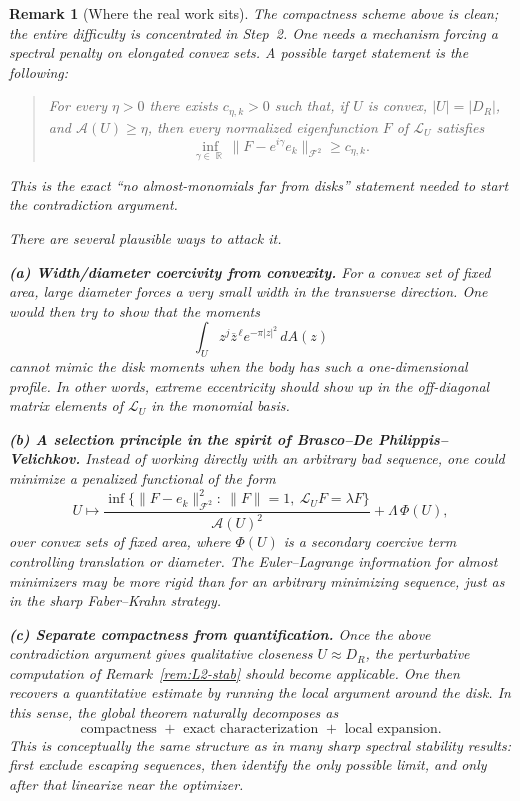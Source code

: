 \documentclass[a4paper,11pt,reqno]{amsart}
\newtheorem{remark}{Remark}[section]
\DeclareMathOperator{\R}{\mathbb{R}}
\begin{document}
\begin{remark}[Where the real work sits]
The compactness scheme above is clean; the entire difficulty is concentrated in
Step~2. One needs a mechanism forcing a spectral penalty on elongated convex sets.
A possible target statement is the following:
\begin{quote}
For every $\eta>0$ there exists $c_{\eta,k}>0$ such that, if $U$ is convex,
$|U|=|D_R|$, and $\mathcal A(U)\ge\eta$, then every normalized eigenfunction
$F$ of $\mathcal L_U$ satisfies
\[
\inf_{\gamma\in\R}\|F-e^{i\gamma}e_k\|_{\mathcal F^2}\ge c_{\eta,k}.
\]
\end{quote}
This is the exact ``no almost-monomials far from disks'' statement needed to
start the contradiction argument.

There are several plausible ways to attack it.

\smallskip
\textbf{(a) Width/diameter coercivity from convexity.}
For a convex set of fixed area, large diameter forces a very small width in the
transverse direction. One would then try to show that the moments
\[
\int_U z^j\overline{z}^{\,\ell}e^{-\pi|z|^2}\,dA(z)
\]
cannot mimic the disk moments when the body has such a one-dimensional profile.
In other words, extreme eccentricity should show up in the off-diagonal matrix
elements of $\mathcal L_U$ in the monomial basis.

\smallskip
\textbf{(b) A selection principle in the spirit of Brasco--De Philippis--Velichkov.}
Instead of working directly with an arbitrary bad sequence, one could minimize a
penalized functional of the form
\[
U\mapsto
\frac{\inf\{\|F-e_k\|_{\mathcal F^2}^2:\ \|F\|=1,\ \mathcal L_UF=\lambda F\}}
{\mathcal A(U)^2}
+\Lambda\,\Phi(U),
\]
over convex sets of fixed area, where $\Phi(U)$ is a secondary coercive term
controlling translation or diameter. The Euler--Lagrange information for almost
minimizers may be more rigid than for an arbitrary minimizing sequence, just as
in the sharp Faber--Krahn strategy.

\smallskip
\textbf{(c) Separate compactness from quantification.}
Once the above contradiction argument gives qualitative closeness $U\approx D_R$,
the perturbative computation of Remark~\ref{rem:L2-stab} should become applicable.
One then recovers a quantitative estimate by running the local argument around
the disk. In this sense, the global theorem naturally decomposes as
\[
\text{compactness }+\text{ exact characterization }+\text{ local expansion}.
\]
This is conceptually the same structure as in many sharp spectral stability
results: first exclude escaping sequences, then identify the only possible limit,
and only after that linearize near the optimizer.
\end{remark}
\end{document}
